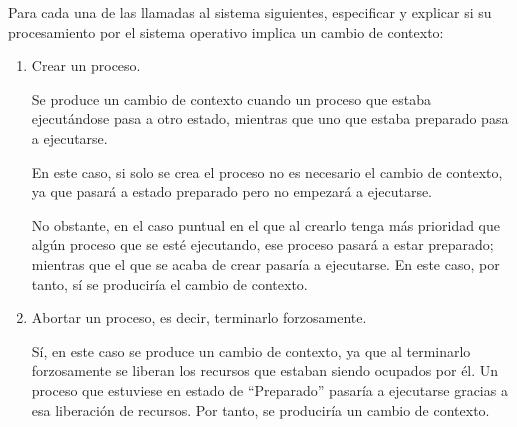 \begin{ejercicio}\label{ej:2.Ejercicio12}
    Para cada una de las llamadas al sistema siguientes, especificar y explicar si su procesamiento por el sistema operativo implica un cambio de contexto:
    \begin{enumerate}
        \item Crear un proceso.

        Se produce un cambio de contexto cuando un proceso que estaba ejecutándose pasa a otro estado, mientras que uno que estaba preparado pasa a ejecutarse.
        
        En este caso, si solo se crea el proceso no es necesario el cambio de contexto, ya que pasará a estado preparado pero no empezará a ejecutarse.
        
        No obstante, en el caso puntual en el que al crearlo tenga más prioridad que algún proceso que se esté ejecutando, ese proceso pasará a estar preparado; mientras que el que se acaba de crear pasaría a ejecutarse. En este caso, por tanto, sí se produciría el cambio de contexto.
        
        \begin{comment}
        Corrección: No, solo es necesario el kernel si se va a modificar la prioridad.
        
        Sí, el procesamiento de la llamada al sistema implica un cambio de contexto, pues siempre que se crea un proceso se creará a su vez un PCB asociado, lo que implica registrar los datos necesarios para la ejecución del proceso, entre ellos el contexto de ejecución.
        \end{comment}

        \item Abortar un proceso, es decir, terminarlo forzosamente.

        Sí, en este caso se produce un cambio de contexto, ya que al terminarlo forzosamente se liberan los recursos que estaban siendo ocupados por él. Un proceso que estuviese en estado de ``Preparado'' pasaría a ejecutarse gracias a esa liberación de recursos. Por tanto, se produciría un cambio de contexto.

        \begin{comment}      
        Sí, ya que el SO debe interrumpir la ejecución del proceso y liberar los recursos que estaba utilizando. Además, el SO debe actualizar la lista de procesos en ejecución o en espera para reflejar el cambio en el estado del proceso abortado.
        \end{comment}


\end{enumerate}
\end{ejercicio}

